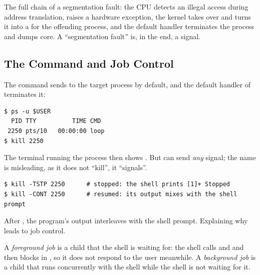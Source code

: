 \begin{remark}
  The full chain of a segmentation fault: the CPU detects an illegal access during address translation, raises a hardware exception, the kernel takes over and turns it into a  for the offending process, and the default handler terminates the process and dumps core. A ``segmentation fault'' is, in the end, a signal.
\end{remark}

\subsection{The \texorpdfstring{}{kill} Command and Job Control}

The  command sends  to the target process by default, and the default handler of  terminates it:
\begin{lstlisting}[style=sh]
$ ps -u $USER
  PID TTY          TIME CMD
 2250 pts/10   00:00:00 loop
$ kill 2250
\end{lstlisting}
The terminal running the process then shows . But  can send \emph{any} signal; the name is misleading, as it does not ``kill'', it ``signals''.
\begin{lstlisting}[style=sh]
$ kill -TSTP 2250      # stopped: the shell prints [1]+ Stopped
$ kill -CONT 2250      # resumed: its output mixes with the shell prompt
\end{lstlisting}
After , the program's output interleaves with the shell prompt. Explaining why leads to job control.

\begin{definition}
  A \emph{foreground job} is a child that the shell is waiting for: the shell calls  and  and then blocks in , so it does not respond to the user meanwhile. A \emph{background job} is a child that runs concurrently with the shell while the shell is not waiting for it.
\end{definition}

